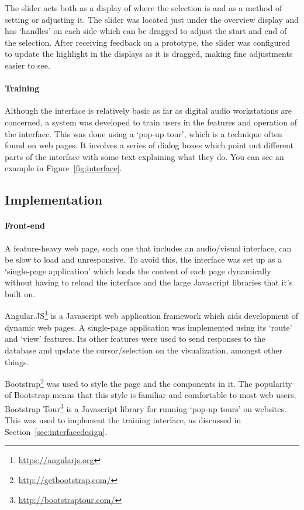 The slider acts both as a display of where the selection is and as a method of setting or adjusting it. The slider was
located just under the overview display and has `handles' on each side which can be dragged to adjust the start and end
of the selection. After receiving feedback on a prototype, the slider was configured to update the highlight in the
displays as it is dragged, making fine adjustments easier to see.

\paragraph{Training}
Although the interface is relatively basic as far as digital audio workstations are concerned, a system was developed
to train users in the features and operation of the interface. This was done using a `pop-up tour', which is a
technique often found on web pages. It involves a series of dialog boxes which point out different parts of the
interface with some text explaining what they do. You can see an example in Figure~\ref{fig:interface}.

\subsection{Implementation}

\paragraph{Front-end}
A feature-heavy web page, such one that includes an audio/visual interface, can be slow to load and unresponsive. To
avoid this, the interface was set up as a `single-page application' which loads the content of each page dynamically
without having to reload the interface and the large Javascript libraries that it's built on.

Angular.JS\footnote{\url{https://angularjs.org}} is a Javascript web application framework which aids development of
dynamic web pages. A single-page application was implemented using its `route' and `view' features.  Its other features
were used to send responses to the database and update the cursor/selection on the visualization, amongst other things.

Bootstrap\footnote{\url{http://getbootstrap.com/}} was used to style the page and the components in it. The popularity
of Bootstrap means that this style is familiar and comfortable to most web users. Bootstrap
Tour\footnote{\url{http://bootstraptour.com/}} is a Javascript library for running `pop-up tours' on websites. This was
used to implement the training interface, as discussed in Section~\ref{sec:interfacedesign}.

